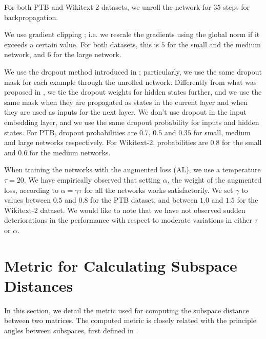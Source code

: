For both PTB and Wikitext-2 datasets, we unroll the network for $35$ steps for backpropagation.

We use gradient clipping \citep{pascanu2013difficulty}; i.e. we rescale the gradients using the global norm if it exceeds a certain value.
For both datasets, this is $5$ for the small and the medium network, and $6$  for the large network.

We use the dropout method introduced in \citet{gal2015theoretically}; particularly, we use the same dropout mask for each example through the unrolled network.
Differently from what was proposed in \citet{gal2015theoretically}, we tie the dropout weights for hidden states further, and we use the same mask when they are propagated as states in the current layer and when they are used as inputs for the next layer.
We don't use dropout in the input embedding layer, and we use the same dropout probability for inputs and hidden states.
For PTB, dropout probabilities are $0.7$, $0.5$ and $0.35$ for small, medium and large networks respectively. For Wikitext-2, probabilities are $0.8$ for the small and $0.6$ for the medium networks.

When training the networks with the augmented loss (AL), we use a temperature  $\tau=20$. We have empirically observed that setting $\alpha$, the weight of the augmented loss, according to $\alpha=\gamma \tau$ for all the networks works satisfactorily. We set $\gamma$ to values between $0.5$ and $0.8$ for the PTB dataset, and between $1.0$ and $1.5$ for the Wikitext-2 dataset. We would like to note that we have not observed sudden deteriorations in the performance with respect to moderate variations in either $\tau$ or $\alpha$.

\section{Metric for Calculating Subspace Distances}
\label{section:subspace-dist}
In this section, we detail the metric used for computing the subspace distance between two matrices. 
The computed metric is closely related with the principle angles between subspaces, first defined in \citet{jordan1875essai}.

